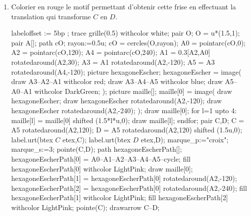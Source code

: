 \begin{corrige}
    \begin{enumerate}
        \item Colorier en rouge le motif permettant d'obtenir cette frise en effectuant la translation qui transforme $C$ en $D$.\\
        \hspace*{-7mm}
        \begin{Geometrie}[CoinHD={(8u,3u)}]
            labeloffset := 5bp ;
            trace grille(0.5) withcolor white;
            pair O;
            O = u*(1.5,1);
            pair A[];
            path cO;
            rayon:=0.5u;
            cO = cercles(O,rayon);
            A0 = pointarc(cO,0);
            A2 = pointarc(cO,120);
            A4 = pointarc(cO,240);
            A1 = 0.3[A2,A0] rotatedaround(A2,30);
            A3 = A1 rotatedaround(A2,-120);
            A5 = A3 rotatedaround(A4,-120);        
            picture hexagoneEscher;
            hexagoneEscher = image(
                draw A3--A2--A1 withcolor red;        
                    draw A3--A4--A5 withcolor blue;        
                    draw A5--A0--A1 withcolor DarkGreen;
            );
            picture maille[];
            maille[0] = image(
                draw hexagoneEscher;
                draw hexagoneEscher rotatedaround(A2,-120);
                draw hexagoneEscher rotatedaround(A2,-240);
            );        
            draw maille[0];
            for l=1 upto 4:
                maille[l] = maille[0] shifted (1.5*l*u,0);
                draw maille[l];
            endfor;
            pair C,D;
            C = A5 rotatedaround(A2,120);
            D = A5 rotatedaround(A2,120) shifted (1.5u,0);
            label.urt(btex $C$ etex,C);
            label.urt(btex $D$ etex,D);
            marque_p:="croix";
            marque_s:=3;
            pointe(C,D);            
            path hexagoneEscherPath[];
            hexagoneEscherPath[0] = A0--A1--A2--A3--A4--A5--cycle;
            fill hexagoneEscherPath[0] withcolor LightPink;
            draw maille[0];
            hexagoneEscherPath[1] = hexagoneEscherPath[0] rotatedaround(A2,-120);
            hexagoneEscherPath[2] = hexagoneEscherPath[0] rotatedaround(A2,-240);
            fill hexagoneEscherPath[1] withcolor LightPink;
            fill hexagoneEscherPath[2] withcolor LightPink;            
            pointe(C);
            drawarrow C--D;

\end{Geometrie}
\end{enumerate}
\end{corrige}
